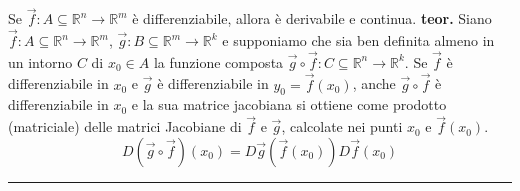 \newline
Se $\vec{f}: A \subseteq \mathbb{R}^n \rightarrow \mathbb{R}^m$ è differenziabile, allora è derivabile e continua.\newline
\newline
\textbf{teor.} Siano $\vec{f}: A \subseteq \mathbb{R}^n \rightarrow \mathbb{R}^m$, $\vec{g}: B \subseteq \mathbb{R}^m \rightarrow \mathbb{R}^k$ e supponiamo che sia ben definita almeno in un intorno $C$ di $x_0 \in A$ la funzione composta $\vec{g} \circ \vec{f}: C \subseteq \mathbb{R}^n \rightarrow \mathbb{R}^k$. Se $\vec{f}$ è differenziabile in $x_0$ e $\vec{g}$ è differenziabile in $y_0 = \vec{f}(x_0)$, anche $\vec{g} \circ \vec{f}$ è differenziabile in $x_0$ e la sua matrice jacobiana si ottiene come prodotto (matriciale) delle matrici Jacobiane di $\vec{f}$ e $\vec{g}$, calcolate nei punti $x_0$ e $\vec{f}(x_0)$.
\[
    D(\vec{g} \circ \vec{f})(x_0) = D \vec{g}(\vec{f}(x_0))D \vec{f}(x_0)
\]
\rule{\textwidth}{2pt}
